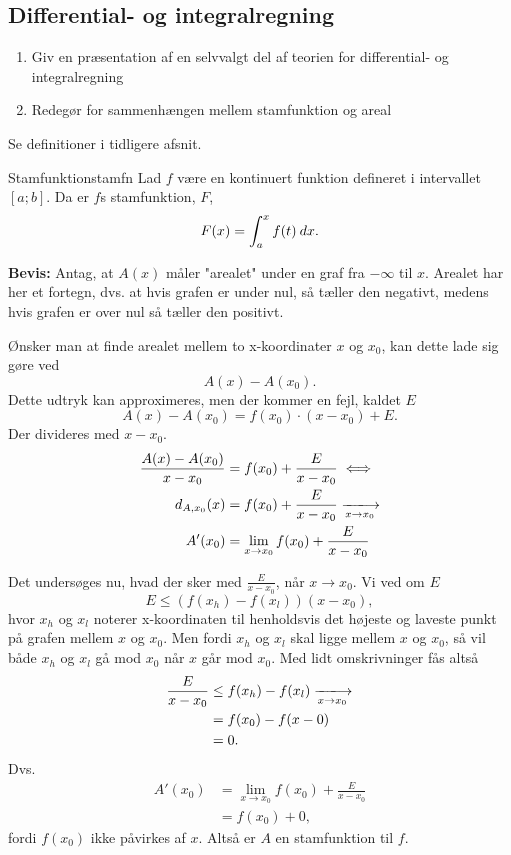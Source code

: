 \documentclass{article}
\begin{document}
\begin{tcolorbox}
	\section{Differential- og integralregning}
	\tcblower
	\begin{enumerate}
		\item Giv en præsentation af en selvvalgt del af teorien for 
			differential- og integralregning
		\item Redegør for sammenhængen mellem stamfunktion og areal
	\end{enumerate}
\end{tcolorbox}
Se definitioner i tidligere afsnit.

\begin{theorem}{Stamfunktion}{stamfn}
	Lad $f$ være en kontinuert funktion defineret i intervallet $[a; b]$. Da er
	$f$s stamfunktion, $F$,
	\[
		F(x) = \int_a^x f(t) \:dx.		
	\] 
\end{theorem}

\textbf{Bevis:}
Antag, at $A(x)$ måler "arealet" under en graf fra $-\infty$ til $x$. Arealet
har her et fortegn, dvs. at hvis grafen er under nul, så tæller den negativt,
medens hvis grafen er over nul så tæller den positivt.

Ønsker man at finde arealet mellem to x-koordinater $x$ og $x_0$, kan dette
lade sig gøre ved
\[
	A(x) - A(x_0).
\] 
Dette udtryk kan approximeres, men der kommer en fejl, kaldet $E$
\[
	A(x) - A(x_0) = f(x_0) \cdot (x-x_0) + E.
\] 
Der divideres med $x-x_0$.
\begin{align*}
	\frac{A(x)-A(x_0)}{x-x_0} &= f(x_0) + \frac{E}{x-x_0}\iff\\
	\sek{A}{x_0}(x) &= f(x_0) + \frac{E}{x-x_0} \xlongrightarrow[x \to x_0]{}\\
	A'(x_0) &= \lim_{x \to x_0} f(x_0) + \frac{E}{x-x_0}
\end{align*}

Det undersøges nu, hvad der sker med $\frac{E}{x-x_0}$, når $x \to x_0$.
Vi ved om $E$
\[
	E \le (f(x_h) - f(x_l))(x-x_0),
\] 
hvor $x_h$ og $x_l$ noterer x-koordinaten til henholdsvis det højeste og
laveste punkt på grafen mellem $x$ og $x_0$. Men fordi $x_h$ og $x_l$ skal
ligge mellem $x$ og $x_0$, så vil både $x_h$ og $x_l$ gå mod $x_0$ når $x$ går
mod $x_0$. Med lidt omskrivninger fås altså
\begin{align*}
	\frac{E}{x-x_0} &\le f(x_h) - f(x_l) \xlongrightarrow[x \to x_0]{}\\
					&= f(x_0) - f(x-0)\\
					&= 0.
\end{align*}
Dvs.
\begin{align*}
	A'(x_0) &= \lim_{x \to x_0} f(x_0) + \frac{E}{x-x_0}\\
		   &= f(x_0) + 0,
\end{align*}
fordi $f(x_0)$ ikke påvirkes af $x$. Altså er $A$ en stamfunktion til $f$.
\end{document}
